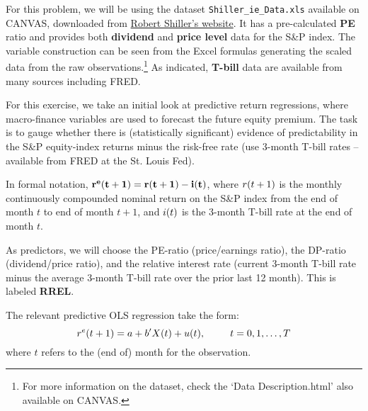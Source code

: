 
For this problem, we will be using the dataset \texttt{Shiller\_ie\_Data.xls} available on CANVAS, downloaded from \href{http://www.econ.yale.edu/~shiller/data.htm}{Robert Shiller's website}. It has a pre-calculated \textbf{PE} ratio and provides both \textbf{dividend} and \textbf{price level} data for the S\&P index. The variable construction can be seen from the Excel formulas generating the scaled data from the raw observations.\footnote{For more information on the dataset, check the `Data Description.html' also available on CANVAS.} As indicated, \textbf{T-bill} data are available from many sources including FRED. \par
For this exercise, we take an initial look at predictive return regressions, where macro-finance variables are used to forecast the future equity premium. The task is to gauge whether there is (statistically significant) evidence of predictability in the S\&P equity-index returns minus the risk-free rate (use 3-month T-bill rates – available from FRED at the St. Louis Fed). \par
In formal notation, \(\mathbf{r^e{\left( t+1 \right)}=r{\left( t+1 \right)}-i{\left( t \right)}}\), where \(r{\left( t+1 \right)}\) is the monthly continuously compounded nominal return on the S\&P index from the end of month \(t\) to end of month \(t+1\), and \(i{\left( t \right)}\) is the 3-month T-bill rate at the end of month \(t\). \par
As predictors, we will choose the PE-ratio (price/earnings ratio), the DP-ratio (dividend/price ratio), and the relative interest rate (current 3-month T-bill rate minus the average 3-month T-bill rate over the prior last 12 month). This is labeled \textbf{RREL}. \par
The relevant predictive OLS regression take the form:
\[
    r^e{\left( t+1 \right)} = a + b^\prime X{\left( t \right)} + u{\left( t \right)}, \hspace{25pt} t = 0,1,\dots,T
\]
where \(t\) refers to the (end of) month for the observation.

